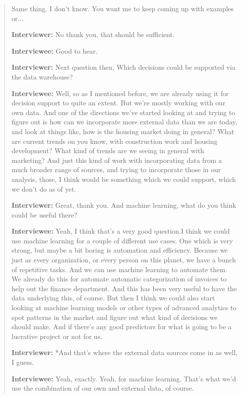 \begin{quote}
    Same thing. I don't know. You want me to keep coming up with examples or...

    \textbf{Interviewer:} No thank you, that should be sufficient.

    \textbf{Interviewee:} Good to hear.

    \textbf{Interviewer:} Next question then, Which decisions could be supported via the data warehouse?

    \textbf{Interviewee:} Well, so as I mentioned before, we are already using it for decision support to quite an extent. But we're mostly working with our own data. And one of the directions we've started looking at and trying to figure out is how can we incorporate more external data than we are today, and look at things like, how is the housing market doing in general? What are current trends on you know, with construction work and housing development? What kind of trends are we seeing in general with marketing? And just this kind of work with incorporating data from a much broader range of sources, and trying to incorporate those in our analysis, those, I think would be something which we could support, which we don't do as of yet.

    \textbf{Interviewer:} Great, thank you. And machine learning, what do you think could be useful there?

    \textbf{Interviewee:} Yeah, I think that's a very good question.I think we could use machine learning for a couple of different use cases. One which is very strong, but maybe a bit boring is automation and efficiency. Because we just as every organization, or every person on this planet, we have a bunch of repetitive tasks. And we can use machine learning to automate them. We already do this for automate automatic categorization of invoices to help out the finance department. And this has been very useful to have the data underlying this, of course. But then I think we could also start looking at machine learning models or other types of advanced analytics to spot patterns in the market and figure out what kind of decisions we should make. And if there's any good predictors for what is going to be a lucrative project or not for us.

    \textbf{Interviewer:} *And that's where the external data sources come in as well, I guess.

    \textbf{Interviewee:} Yeah, exactly. Yeah, for machine learning. That's what we'd use the combination of our own and external data, of course.


\end{quote}
